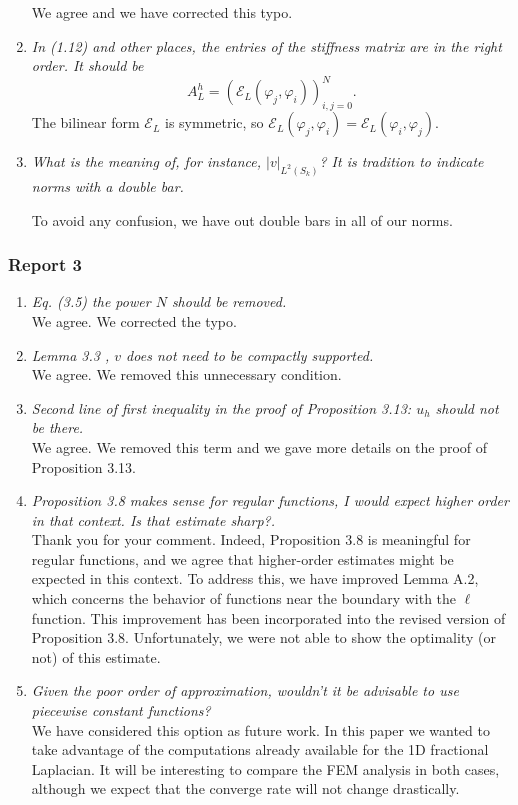 \documentclass[11 pt]{article}
\numberwithin{equation}{section}
\begin{document}
\begin{enumerate}
    We agree and we have corrected this typo.

    \item \emph{In (1.12) and other places, the entries of the stiffness matrix are in the right order. It should be
    \[
    A_L^h = (\mathcal E_L(\varphi_j, \varphi_i))_{i,j=0}^{N}.
    \]}
    The bilinear form $\mathcal E_L$ is symmetric, so $\mathcal E_L(\varphi_j, \varphi_i)=\mathcal E_L(\varphi_i, \varphi_j)$.

    \item \emph{What is the meaning of, for instance, \( |v|_{L^2(S_k)} \)? It is tradition to indicate norms with a double bar.}

To avoid any confusion, we have out double bars in all of our norms.
\end{enumerate}


\newpage


\subsubsection*{Report 3}

\begin{enumerate}
\item \emph{Eq. (3.5) the power $N$ should be removed.}\\
We agree. We corrected the typo.
\item \emph{Lemma 3.3 , $v$ does not need to be compactly supported.}\\
We agree. We removed this unnecessary condition.
\item \emph{Second line of first inequality in the proof of Proposition 3.13: $u_h$ should not be there.}\\
We agree. We removed this term and we gave more details on the proof of Proposition 3.13.
\item \emph{Proposition 3.8 makes sense for regular functions, I would expect higher order in that context. Is that estimate sharp?.}\\
Thank you for your comment. Indeed, Proposition 3.8 is meaningful for regular functions, and we agree that higher-order estimates might be expected in this context. To address this, we have improved Lemma A.2, which concerns the behavior of functions near the boundary with the $\ell$ function. This improvement has been incorporated into the revised version of Proposition 3.8.  Unfortunately, we were not able to show the optimality (or not) of this estimate.
\item \emph{Given the poor order of approximation, wouldn't it be advisable to use piecewise constant functions?}\\
We have considered this option as future work.  In this paper we wanted to take advantage of the computations already available for the 1D fractional Laplacian. It will be interesting to compare the FEM analysis in both cases, although we expect that the converge rate will not change drastically.
\end{enumerate}
\end{document}
